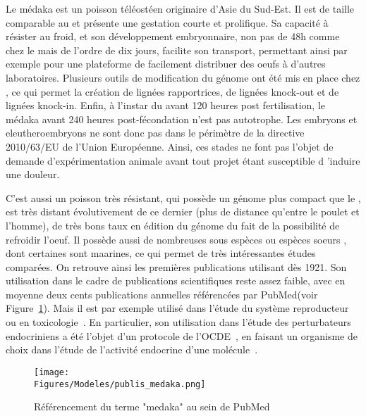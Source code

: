 \documentclass[\main/main.tex]{subfiles}
\begin{document}
%
Le médaka est un poisson téléostéen originaire d'Asie du Sud-Est.
%
Il est de taille comparable au \pz{} et présente une gestation courte et prolifique.
%
Sa capacité à résister au froid, et son développement embryonnaire, non pas de 48h comme chez le \pz{} mais de l'ordre de dix jours,  facilite son transport, permettant ainsi par exemple pour une plateforme de facilement distribuer des oeufs à d'autres laboratoires.
%
Plusieurs outils de modification du génome ont été mis en place chez \ol{}\cite{kirchmaier_2015, ansai_2017}, 
ce qui permet la création de lignées rapportrices, de lignées knock-out et de lignées knock-in\cite{abdelmoneim_2018,jin_2020,Watakabe_2018,qiu_2014,gay_2018}.
%
Enfin, à l'instar du \pz{} avant 120 heures post fertilisation,
le médaka avant 240 heures post-fécondation n'est pas autotrophe.
%
Les embryons et eleutheroembryons ne sont donc pas dans le périmètre de la directive 2010/63/EU de l'Union Européenne.
%
Ainsi, ces stades ne font pas l'objet de demande d'expérimentation animale avant tout projet étant susceptible d 'induire une douleur.

%
C'est aussi un poisson très résistant, qui possède un génome plus compact que le \pz{} , est très distant évolutivement de ce dernier (plus de distance qu'entre le poulet et l'homme), de très bons taux en édition du génome du fait de la possibilité de refroidir l'oeuf. Il possède aussi de nombreuses sous espèces ou espèces soeurs , dont certaines sont maarines, ce qui permet de très intéressantes études comparées.
%
On retrouve ainsi les premières publications utilisant \ol{} dès 1921\cite{aida_1921}.
%
Son utilisation dans le cadre de publications scientifiques reste assez faible, avec en moyenne deux cents publications annuelles référencées par PubMed(voir Figure~\ref{fig:model:oz:stats}).
%
Mais il est par exemple utilisé dans l'étude du système reproducteur~\cite{gay_2018,herberg_2018} ou
en toxicologie~\cite{carvan_2007,bertotto_2019,cleary_2019,powe_2018}.
%
En particulier, son utilisation dans l'étude des perturbateurs endocriniens a été l'objet d'un protocole de l'OCDE~\cite{oecd_2009}, en faisant un organisme de choix dans l'étude de l'activité endocrine d'une molécule~\cite{chen_2018,dang_2019,spirhanzlova_2016}.

\begin{figure}[htbp]{\textwidth} 
    \centering
       \centering \texttt{[image: \\Figures/Modeles/publis\_medaka.png]}
       \caption{
            \label{fig:model:oz:stats}Référencement du terme "medaka" au sein de PubMed
            }
\end{figure}
\end{document}
